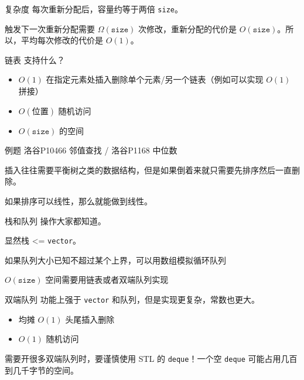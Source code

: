 \documentclass[11pt,aspectratio=169]{beamer}
\begin{document}
\begin{frame}{复杂度}
    每次重新分配后，容量约等于两倍 \texttt{size}。

    触发下一次重新分配需要 $\Omega(\mathtt{size})$ 次修改，重新分配的代价是 $O(\mathtt{size})$。所以，平均每次修改的代价是 $O(1)$。
\end{frame}

\begin{frame}{链表}
    支持什么？

    \begin{itemize}
        \item $O(1)$ 在指定元素处插入删除单个元素/另一个链表（例如可以实现 $O(1)$ 拼接）
        \item $O(\text{位置})$ 随机访问
        \item $O(\mathtt{size})$ 的空间
    \end{itemize}
\end{frame}

\begin{frame}{例题}
    洛谷P10466 邻值查找 / 洛谷P1168 中位数

    插入往往需要平衡树之类的数据结构，但是如果倒着来就只需要先排序然后一直删除。
    
    如果排序可以线性，那么就能做到线性。
\end{frame}

\begin{frame}{栈和队列}
    操作大家都知道。

    显然栈 <= \texttt{vector}。

    如果队列大小已知不超过某个上界，可以用数组模拟循环队列

    $O(\mathtt{size})$ 空间需要用链表或者双端队列实现
\end{frame}

\begin{frame}{双端队列}
    功能上强于 \texttt{vector} 和队列，但是实现更复杂，常数也更大。

    \begin{itemize}
        \item 均摊 $O(1)$ 头尾插入删除
        \item $O(1)$ 随机访问
    \end{itemize}

    需要开很多双端队列时，要谨慎使用 STL 的 \texttt{deque}！一个空 \texttt{deque} 可能占用几百到几千字节的空间。 
\end{frame}
\end{document}

